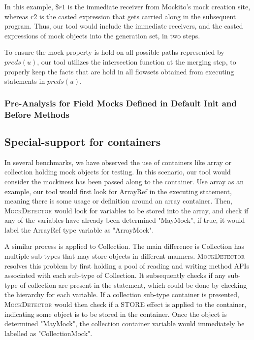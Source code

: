 In this example, $\$r1$ is the immediate receiver from Mockito's mock creation site, whereas $r2$ is the casted expression that gets carried along in the subsequent program. Thus, our tool would include the immediate receivers, and the casted expressions of mock objects into the generation set, in two steps. 

To ensure the mock property is hold on all possible paths represented by $preds(u)$, our tool utilizes the intersection function at the merging step, to properly keep the facts that are hold in all flowsets obtained from executing statements in $preds(u)$.

\subsubsection{Pre-Analysis for Field Mocks Defined in Default Init and Before Methods}
\label{subsubsec:pre-analysis}

\subsection{Special-support for containers}
\label{subsec:container}

In several benchmarks, we have observed the use of containers like array or collection holding mock objects for testing. In this scenario, our tool would consider the mockiness has been passed along to the container. Use array as an example, our tool would first look for ArrayRef in the executing statement, meaning there is some usage or definition around an array container. Then, \textsc{MockDetector} would look for variables to be stored into the array, and check if any of the variables have already been determined "MayMock", if true, it would label the ArrayRef type variable as "ArrayMock".

A similar process is applied to Collection. The main difference is Collection has multiple sub-types that may store objects in different manners. \textsc{MockDetector} resolves this problem by first holding a pool of reading and writing method APIs associated with each sub-type of Collection. It subsequently checks if any sub-type of collection are present in the statement, which could be done by checking the hierarchy for each variable. If a collection sub-type container is presented, \textsc{MockDetector} would then check if a STORE effect is applied to the container, indicating some object is to be stored in the container. Once the object is determined "MayMock", the collection container variable would immediately be labelled as "CollectionMock".

